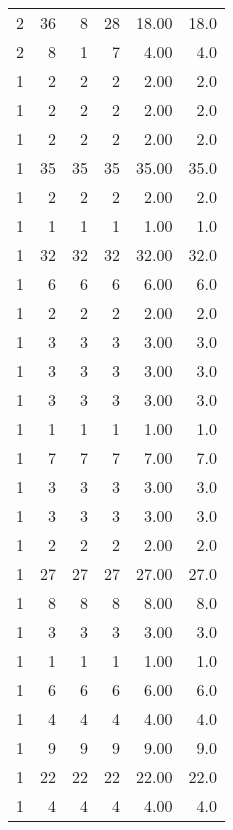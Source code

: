 \begin{tabular}{rrrrrr}
         2 &          36 &    8 &   28 &  18.00 &     18.0 \\
         2 &           8 &    1 &    7 &   4.00 &      4.0 \\
         1 &           2 &    2 &    2 &   2.00 &      2.0 \\
         1 &           2 &    2 &    2 &   2.00 &      2.0 \\
         1 &           2 &    2 &    2 &   2.00 &      2.0 \\
         1 &          35 &   35 &   35 &  35.00 &     35.0 \\
         1 &           2 &    2 &    2 &   2.00 &      2.0 \\
         1 &           1 &    1 &    1 &   1.00 &      1.0 \\
         1 &          32 &   32 &   32 &  32.00 &     32.0 \\
         1 &           6 &    6 &    6 &   6.00 &      6.0 \\
         1 &           2 &    2 &    2 &   2.00 &      2.0 \\
         1 &           3 &    3 &    3 &   3.00 &      3.0 \\
         1 &           3 &    3 &    3 &   3.00 &      3.0 \\
         1 &           3 &    3 &    3 &   3.00 &      3.0 \\
         1 &           1 &    1 &    1 &   1.00 &      1.0 \\
         1 &           7 &    7 &    7 &   7.00 &      7.0 \\
         1 &           3 &    3 &    3 &   3.00 &      3.0 \\
         1 &           3 &    3 &    3 &   3.00 &      3.0 \\
         1 &           2 &    2 &    2 &   2.00 &      2.0 \\
         1 &          27 &   27 &   27 &  27.00 &     27.0 \\
         1 &           8 &    8 &    8 &   8.00 &      8.0 \\
         1 &           3 &    3 &    3 &   3.00 &      3.0 \\
         1 &           1 &    1 &    1 &   1.00 &      1.0 \\
         1 &           6 &    6 &    6 &   6.00 &      6.0 \\
         1 &           4 &    4 &    4 &   4.00 &      4.0 \\
         1 &           9 &    9 &    9 &   9.00 &      9.0 \\
         1 &          22 &   22 &   22 &  22.00 &     22.0 \\
         1 &           4 &    4 &    4 &   4.00 &      4.0 \\
\bottomrule
\end{tabular}
